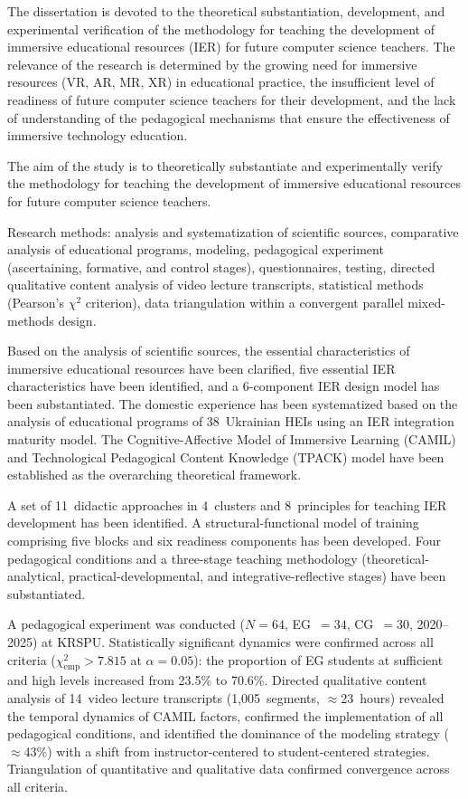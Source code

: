 The dissertation is devoted to the theoretical substantiation, development, and experimental verification of the methodology for teaching the development of immersive educational resources (IER) for future computer science teachers. The relevance of the research is determined by the growing need for immersive resources (VR, AR, MR, XR) in educational practice, the insufficient level of readiness of future computer science teachers for their development, and the lack of understanding of the pedagogical mechanisms that ensure the effectiveness of immersive technology education.

The aim of the study is to theoretically substantiate and experimentally verify the methodology for teaching the development of immersive educational resources for future computer science teachers.

Research methods: analysis and systematization of scientific sources, comparative analysis of educational programs, modeling, pedagogical experiment (ascertaining, formative, and control stages), questionnaires, testing, directed qualitative content analysis of video lecture transcripts, statistical methods (Pearson's $\chi^2$ criterion), data triangulation within a convergent parallel mixed-methods design.

Based on the analysis of scientific sources, the essential characteristics of immersive educational resources have been clarified, five essential IER characteristics have been identified, and a 6-component IER design model has been substantiated. The domestic experience has been systematized based on the analysis of educational programs of 38~Ukrainian HEIs using an IER integration maturity model. The Cognitive-Affective Model of Immersive Learning (CAMIL) and Technological Pedagogical Content Knowledge (TPACK) model have been established as the overarching theoretical framework.

A set of 11~didactic approaches in 4~clusters and 8~principles for teaching IER development has been identified. A structural-functional model of training comprising five blocks and six readiness components has been developed. Four pedagogical conditions and a three-stage teaching methodology (theoretical-analytical, practical-developmental, and integrative-reflective stages) have been substantiated.

A pedagogical experiment was conducted ($N = 64$, EG~$= 34$, CG~$= 30$, 2020--2025) at KRSPU. Statistically significant dynamics were confirmed across all criteria ($\chi^2_{\text{emp}} > 7.815$ at $\alpha = 0.05$): the proportion of EG students at sufficient and high levels increased from 23.5\% to 70.6\%. Directed qualitative content analysis of 14~video lecture transcripts (1,005~segments, $\approx$23~hours) revealed the temporal dynamics of CAMIL factors, confirmed the implementation of all pedagogical conditions, and identified the dominance of the modeling strategy ($\approx$43\%) with a shift from instructor-centered to student-centered strategies. Triangulation of quantitative and qualitative data confirmed convergence across all criteria.

